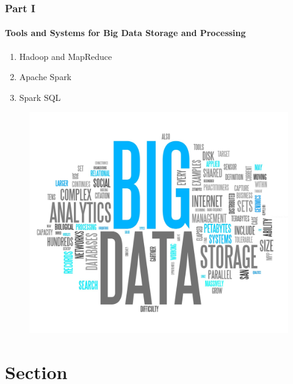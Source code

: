 \begin{frame}
    \frametitle{Part I}
    \framesubtitle{Tools and Systems for Big Data Storage and Processing}
    
    \begin{minipage}{0.5\textwidth}
        \begin{enumerate}
            \itemsep1.3em
            \item Hadoop and MapReduce
            \item Apache Spark
            \item Spark SQL
        \end{enumerate}
    \end{minipage} \hfill
    \begin{minipage}{0.49\textwidth}
        \begin{figure}
            \includegraphics[width=1.0\linewidth]{images/big_data_image.jpg}
        \end{figure}
    \end{minipage}
    
\end{frame}

\section{Section}
